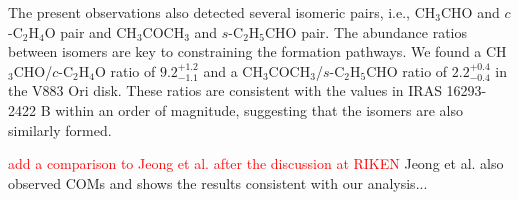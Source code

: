 \documentclass[twocolumn, twocolappendix, astrosymb, times]{aastex631}
\newcommand{\methanol}{CH$_3$OH\xspace}
\newcommand{\acetaldehyde}{CH$_3$CHO\xspace}
\newcommand{\methylformate}{CH$_3$OCHO\xspace}
\newcommand{\acetone}{CH$_3$COCH$_3$\xspace}
\newcommand{\ethyleneoxide}{$c$-C$_2$H$_4$O\xspace}
\newcommand{\propenal}{$t$-C$_2$H$_3$CHO\xspace}
\newcommand{\propanal}{$s$-C$_2$H$_5$CHO\xspace}
\begin{document}
The present observations also detected several isomeric pairs, i.e., \acetaldehyde and \ethyleneoxide pair and \acetone and \propanal pair. The abundance ratios between isomers are key to constraining the formation pathways. We found a \acetaldehyde/\ethyleneoxide ratio of $9.2_{-1.1}^{+1.2}$ and a \acetone/\propanal ratio of $2.2_{-0.4}^{+0.4}$ in the V883 Ori disk. These ratios are consistent with the values in IRAS 16293-2422 B \citep{Lykke2017} within an order of magnitude, suggesting that the isomers are also similarly formed.  

\textcolor{red}{add a comparison to Jeong et al. after the discussion at RIKEN}
Jeong et al. also observed COMs and shows the results consistent with our analysis...



\end{document}
